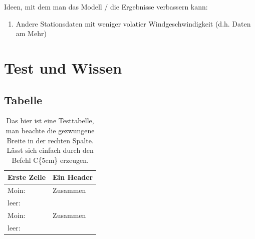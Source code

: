 \documentclass[
12pt, %
toc=listofnumbered, %
toc=chapterentrydotfill, %
numbers=noenddot, %
captions=tableheading, %
bibliography=numbered
]{scrreprt}
\let\Oldsection\section
\renewcommand{\section}{\FloatBarrier\Oldsection}
\begin{document}
Ideen, mit dem man das Modell / die Ergebnisse verbassern kann:

\begin{enumerate}
	\item Andere Stationsdaten mit weniger volatier Windgeschwindigkeit (d.h. Daten am Mehr)
\end{enumerate}
\chapter{Test und Wissen}

\section{Tabelle}
\begin{table}[ht]
	\centering
	\caption{Das hier ist eine Testtabelle, man beachte die gezwungene Breite in der rechten Spalte. Lässt sich einfach durch den Befehl C\{5cm\} erzeugen.}
	\begin{tabular}{|l|C{5cm}|}
		\hline
		\textbf{Erste Zelle}&\textbf{Ein Header}\\
		\hline
		Moin: & Zusammen\\\hline
		leer:&\\\hline
		Moin: & Zusammen\\\hline
		leer:&\\\hline
	\end{tabular}
\label{tab:testtabelle}
\end{table}
\end{document}
